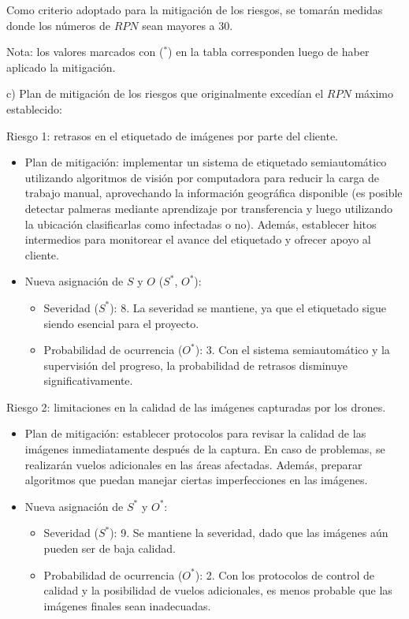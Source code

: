 \documentclass[
11pt, %
]{charter}
\begin{document}
Como criterio adoptado para la mitigación de los riesgos, se tomarán medidas donde los números de $RPN$ sean mayores a 30.

Nota: los valores marcados con ($^*$) en la tabla corresponden luego de haber aplicado la mitigación.

c) Plan de mitigación de los riesgos que originalmente excedían el $RPN$ máximo establecido:

Riesgo 1: retrasos en el etiquetado de imágenes por parte del cliente.
\begin{itemize}
  \item Plan de mitigación: implementar un sistema de etiquetado semiautomático utilizando algoritmos de visión por computadora para reducir la carga de trabajo manual, aprovechando la información geográfica disponible (es posible detectar palmeras mediante aprendizaje por transferencia y luego utilizando la ubicación clasificarlas como infectadas o no). Además, establecer hitos intermedios para monitorear el avance del etiquetado y ofrecer apoyo al cliente.
  \item Nueva asignación de $S$ y $O$ ($S^*$, $O^*$):
        \begin{itemize}
          \item Severidad ($S^*$): 8. La severidad se mantiene, ya que el etiquetado sigue siendo esencial para el proyecto.
          \item Probabilidad de ocurrencia ($O^*$): 3. Con el sistema semiautomático y la supervisión del progreso, la probabilidad de retrasos disminuye significativamente.
        \end{itemize}
\end{itemize}

Riesgo 2: limitaciones en la calidad de las imágenes capturadas por los drones.
\begin{itemize}
  \item Plan de mitigación: establecer protocolos para revisar la calidad de las imágenes inmediatamente después de la captura. En caso de problemas, se realizarán vuelos adicionales en las áreas afectadas. Además, preparar algoritmos que puedan manejar ciertas imperfecciones en las imágenes.
  \item Nueva asignación de $S^*$ y $O^*$:
        \begin{itemize}
          \item Severidad ($S^*$): 9. Se mantiene la severidad, dado que las imágenes aún pueden ser de baja calidad.
          \item Probabilidad de ocurrencia ($O^*$): 2. Con los protocolos de control de calidad y la posibilidad de vuelos adicionales, es menos probable que las imágenes finales sean inadecuadas.
        \end{itemize}
\end{itemize}
\end{document}
